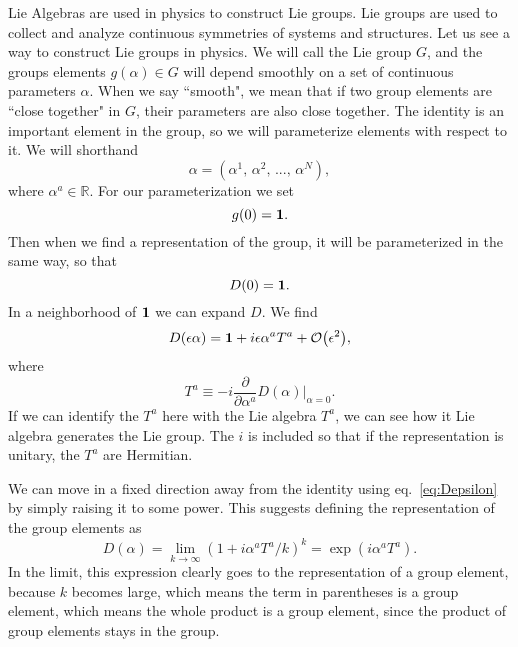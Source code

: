 Lie Algebras are used in physics to construct Lie groups.
Lie groups are used to collect and analyze continuous symmetries of systems
and structures.
Let us see a way to construct Lie groups in physics. We will call the 
Lie group $G$, and the groups elements $g(\alpha)\in G$ will depend
smoothly on a set of continuous parameters $\alpha$. When we say ``smooth", we
mean that if two group elements are ``close together" in $G$, their parameters
are also close together. The identity is an important element in the group, so
we will parameterize elements with respect to it. We will shorthand
\begin{equation}
  \alpha=\left(\alpha^1,\,\alpha^2,\,...,\,\alpha^N\right),
\end{equation}
where $\alpha^a\in\mathbb{R}$. For our parameterization we set
\begin{equation}
  g(0)={\mathbf 1}.
\end{equation}
Then when we find a representation of the group, it will be
parameterized in the same way, so that
\begin{equation}
  D(0)={\mathbf 1}.
\end{equation}
In a neighborhood of ${\mathbf 1}$ we can expand $D$. We find
\begin{equation}\label{eq:Depsilon}
  D(\epsilon\alpha)=\id+i\epsilon\alpha^aT^a+\order{\epsilon^2},
\end{equation}
where
\begin{equation}
  T^a\equiv-i\frac{\partial}{\partial\alpha^a}D(\alpha)\Big|_{\alpha=0}.
\end{equation}
If we can identify the $T^a$ here with the Lie algebra $T^a$, we can see
how it Lie algebra generates the Lie group. The $i$ is included so that
if the representation is unitary, the $T^a$ are Hermitian.

We can move in a fixed direction away from the identity using
eq.~\eqref{eq:Depsilon} by simply raising it to some power. This suggests
defining the representation of the group elements as
\begin{equation}
  D(\alpha)=\lim_{k\to\infty}\left(1+i\alpha^aT^a/k\right)^k
           =\exp(i\alpha^aT^a).
\end{equation}
In the limit, this expression clearly goes to the representation of a group 
element, because $k$ becomes large, which means the term in parentheses is a 
group element, which means the whole product is a group element, since the
product of group elements stays in the group.

